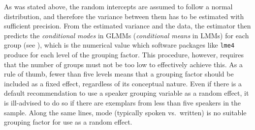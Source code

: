 As was stated above, the random intercepts are assumed to follow a normal distribution, and therefore the variance between them has to be estimated with sufficient precision.
From the estimated variance and the data, the estimator then predicts the \textit{conditional modes} in GLMMs (\textit{conditional means} in LMMs) for each group (see \citealt[Ch.~1]{Bates2010}), which is the numerical value which software packages like \texttt{lme4} produce for each level of the grouping factor.
This procedure, however, requires that the number of groups must not be too low to effectively achieve this.
As a rule of thumb, fewer than five levels means that a grouping factor should be included as a fixed effect, regardless of its conceptual nature.
Even if there is a default recommendation to use a speaker grouping variable as a random effect, it is ill-advised to do so if there are exemplars from less than five speakers in the sample.
Along the same lines, mode (typically spoken vs.\ written) is no suitable grouping factor for use as a random effect.

